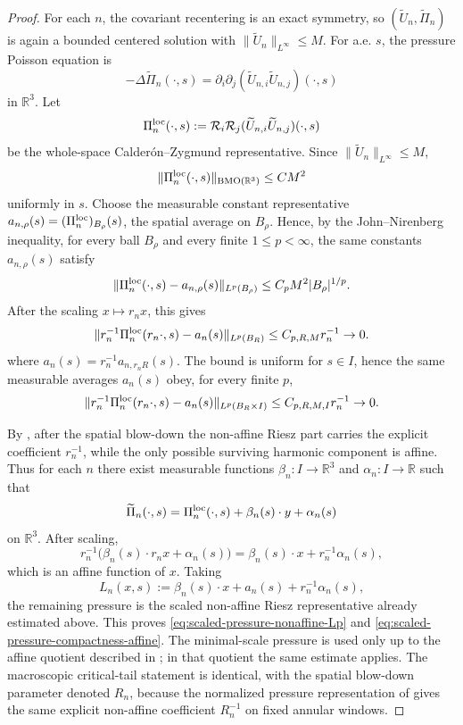 \documentclass[11pt]{amsart}
\numberwithin{equation}{section}
\theoremstyle{plain}
\theoremstyle{definition}
\theoremstyle{remark}
\begin{document}
\begin{proof}
For each \(n\), the covariant recentering is an exact symmetry, so
\((\widetilde U_n,\widetilde\Pi_n)\) is again a bounded centered solution with
\(\|\widetilde U_n\|_{L^\infty}\le M\).  For a.e. \(s\), the pressure
Poisson equation is
\[
   -\Delta\widetilde\Pi_n(\cdot,s)
   =\partial_i\partial_j(\widetilde U_{n,i}\widetilde U_{n,j})(\cdot,s)
\]
in \(\mathbb R^3\).  Let
\[
   \Pi_n^{\rm loc}(\cdot,s)
   :=\mathcal R_i\mathcal R_j(\widetilde U_{n,i}\widetilde U_{n,j})(\cdot,s)
\]
be the whole-space Calder\'on--Zygmund representative.  Since
\(\|\widetilde U_n\|_{L^\infty}\le M\),
\[
   \|\Pi_n^{\rm loc}(\cdot,s)\|_{\mathrm{BMO}(\mathbb R^3)}
   \le C M^2
\]
uniformly in \(s\).  Choose the measurable constant representative
\(a_{n,\rho}(s)=(\Pi_n^{\rm loc})_{B_\rho}(s)\), the spatial average on
\(B_\rho\).  Hence, by the John--Nirenberg inequality, for every ball
\(B_\rho\) and every finite \(1\le p<\infty\), the same constants
\(a_{n,\rho}(s)\) satisfy
\[
   \|\Pi_n^{\rm loc}(\cdot,s)-a_{n,\rho}(s)\|_{L^p(B_\rho)}
   \le C_{p} M^2 |B_\rho|^{1/p}.
\]
After the scaling \(x\mapsto r_nx\), this gives
\[
   \|r_n^{-1}\Pi_n^{\rm loc}(r_n\cdot,s)-a_n(s)\|_{L^p(B_R)}
   \le C_{p,R,M}r_n^{-1}\to0 .
\]
where \(a_n(s)=r_n^{-1}a_{n,r_nR}(s)\).  The bound is uniform for \(s\in I\),
hence the same measurable averages \(a_n(s)\) obey, for every finite \(p\),
\[
   \|r_n^{-1}\Pi_n^{\rm loc}(r_n\cdot,s)-a_n(s)\|_{L^p(B_R\times I)}
   \le C_{p,R,M,I}r_n^{-1}\to0 .
\]

By , after the spatial blow-down
the non-affine Riesz part carries the explicit coefficient \(r_n^{-1}\), while
the only possible surviving harmonic component is affine.  Thus for each \(n\)
there exist measurable functions \(\beta_n:I\to\mathbb R^3\) and
\(\alpha_n:I\to\mathbb R\) such that
\[
   \widetilde\Pi_n(\cdot,s)
   =\Pi_n^{\rm loc}(\cdot,s)+\beta_n(s)\cdot y+\alpha_n(s)
\]
on \(\mathbb R^3\).  After scaling,
\[
   r_n^{-1}\bigl(\beta_n(s)\cdot r_nx+\alpha_n(s)\bigr)
   =
   \beta_n(s)\cdot x+r_n^{-1}\alpha_n(s),
\]
which is an affine function of \(x\).  Taking
\[
   L_n(x,s):=\beta_n(s)\cdot x+a_n(s)+r_n^{-1}\alpha_n(s),
\]
the remaining pressure is the scaled non-affine Riesz representative already estimated
above.  This proves \eqref{eq:scaled-pressure-nonaffine-Lp} and
\eqref{eq:scaled-pressure-compactness-affine}.  The minimal-scale pressure is used
only up to the affine quotient described in
; in that quotient the same estimate
applies.  The macroscopic critical-tail statement is identical, with the spatial
blow-down parameter denoted \(R_n\), because the normalized pressure
representation of  gives the same
explicit non-affine coefficient \(R_n^{-1}\) on fixed annular windows.
\end{proof}
\end{document}
